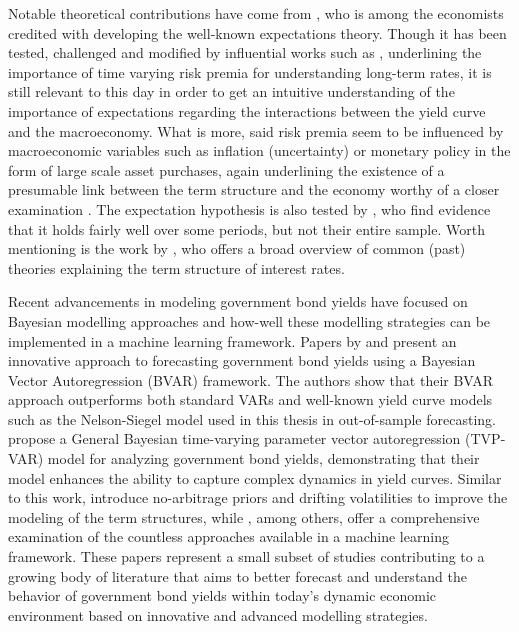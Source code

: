


Notable theoretical contributions have come from \citet{hicks1946value}, who is among the economists credited with developing the well-known expectations theory.
Though it has been tested, challenged and modified by influential works such as \citet{campbell1991yield}, underlining the importance of time varying risk premia for understanding long-term rates, it is still relevant to this day in order to  get an intuitive understanding of the importance of expectations regarding the interactions between the yield curve and the macroeconomy.
What is more, said risk premia seem to be influenced by macroeconomic variables such as inflation (uncertainty) or monetary policy in the form of large scale asset purchases, again underlining the existence of a presumable link between the term structure and the economy worthy of a closer examination \citep{Gürkaynak_Wright_2012}. 
The expectation hypothesis is also tested by \citet{diebold2006macroeconomy}, who find evidence that it holds fairly well over some periods, but not their entire sample. 
Worth mentioning is the work by \citet{kessel1971cyclical}, who offers a broad overview of common (past) theories explaining the term structure of interest rates.

Recent advancements in modeling government bond yields have focused on Bayesian modelling approaches and how-well these modelling strategies can be implemented in a machine learning framework.
Papers by \citet{Carriero_2011} and \citet{CARRIERO20122026} present an innovative approach to forecasting government bond yields using a Bayesian Vector Autoregression (BVAR) framework. 
The authors show that their BVAR approach outperforms both standard VARs and well-known yield curve models such as the Nelson-Siegel model used in this thesis in out-of-sample forecasting.  
\citet{Fischer_et_al_2023} propose a General Bayesian time-varying parameter vector autoregression (TVP-VAR) model for analyzing government bond yields, demonstrating that their model enhances the ability to capture complex dynamics in yield curves. 
Similar to this work, \citet{Carriero_et_al_2021} introduce no-arbitrage priors and drifting volatilities to improve the modeling of the term structures, while \citet{pedersen2019survey}, among others, offer a comprehensive examination of the countless approaches available in a machine learning framework. 
These papers represent a small subset of studies contributing to a growing body of literature that aims to better forecast and understand the behavior of government bond yields within today's dynamic economic environment based on innovative and advanced modelling strategies. 
